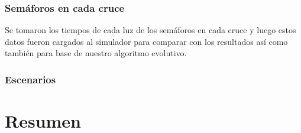 \subsubsection{Semáforos en cada cruce}
Se  tomaron  los  tiempos  de  cada  luz  de  los  semáforos  en
cada  cruce  y  luego  estos  datos  fueron  cargados  al  simulador
para comparar con los  resultados  así como también para base
de nuestro algoritmo evolutivo.
\subsubsection{Escenarios}


\section{Resumen}

